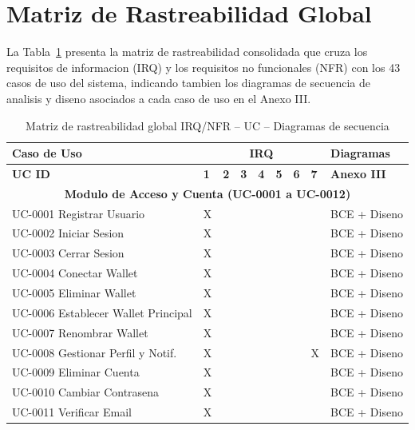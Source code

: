 \documentclass[11pt, a4paper]{article}
\begin{document}
{\section{Matriz de Rastreabilidad Global}

La Tabla~\ref{tab:mtr-global} presenta la matriz de rastreabilidad consolidada que cruza los requisitos de informacion (IRQ) y los requisitos no funcionales (NFR) con los 43 casos de uso del sistema, indicando tambien los diagramas de secuencia de analisis y diseno asociados a cada caso de uso en el Anexo III.

{\setlength{\tabcolsep}{2pt}
\begin{center}
{\tiny
\begin{longtable}{|p{1.5cm}|p{1.0cm}p{0.9cm}p{0.9cm}p{0.9cm}p{0.9cm}p{0.9cm}p{0.9cm}|p{1.5cm}|}
\caption{Matriz de rastreabilidad global IRQ/NFR -- UC -- Diagramas de secuencia} \label{tab:mtr-global} \\
\hline
\textbf{Caso de Uso} & \multicolumn{7}{c|}{\textbf{IRQ}} & \textbf{Diagramas} \\
\hline
\textbf{UC ID} & \textbf{1} & \textbf{2} & \textbf{3} & \textbf{4} & \textbf{5} & \textbf{6} & \textbf{7} & \textbf{Anexo III} \\
\hline
\hline
\endhead
\multicolumn{9}{c}{\textbf{Modulo de Acceso y Cuenta (UC-0001 a UC-0012)}} \\
\hline
UC-0001 Registrar Usuario & X &  &  &  &  &  &  & BCE + Diseno \\
\hline
UC-0002 Iniciar Sesion & X &  &  &  &  &  &  & BCE + Diseno \\
\hline
UC-0003 Cerrar Sesion & X &  &  &  &  &  &  & BCE + Diseno \\
\hline
UC-0004 Conectar Wallet & X &  &  &  &  &  &  & BCE + Diseno \\
\hline
UC-0005 Eliminar Wallet & X &  &  &  &  &  &  & BCE + Diseno \\
\hline
UC-0006 Establecer Wallet Principal & X &  &  &  &  &  &  & BCE + Diseno \\
\hline
UC-0007 Renombrar Wallet & X &  &  &  &  &  &  & BCE + Diseno \\
\hline
UC-0008 Gestionar Perfil y Notif. & X &  &  &  &  &  & X & BCE + Diseno \\
\hline
UC-0009 Eliminar Cuenta & X &  &  &  &  &  &  & BCE + Diseno \\
\hline
UC-0010 Cambiar Contrasena & X &  &  &  &  &  &  & BCE + Diseno \\
\hline
UC-0011 Verificar Email & X &  &  &  &  &  &  & BCE + Diseno \\

\end{longtable}}
\end{center}}}
\end{document}
